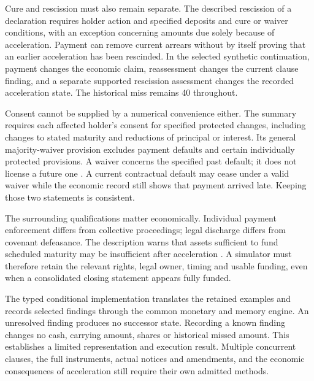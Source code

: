 Cure and rescission must also remain separate. The described rescission of a
declaration requires holder action and specified deposits and cure or waiver
conditions, with an exception concerning amounts due solely because of
acceleration. Payment can remove current arrears without by itself proving
that an earlier acceleration has been rescinded. In the selected synthetic
continuation, payment changes the economic claim, reassessment changes the
current clause finding, and a separate supported rescission assessment changes
the recorded acceleration state. The historical miss remains 40 throughout.

Consent cannot be supplied by a numerical convenience either. The summary
requires each affected holder's consent for specified protected changes,
including changes to stated maturity and reductions of principal or interest.
Its general majority-waiver provision excludes payment defaults and certain
individually protected provisions. A waiver concerns the specified past
default; it does not license a future one
\citep[Exhibit 4.1, printed pp.~11--12]{apple2024}. A current contractual default
may cease under a valid waiver while the economic record still shows that
payment arrived late. Keeping those two statements is consistent.

The surrounding qualifications matter economically. Individual payment
enforcement differs from collective proceedings; legal discharge differs
from covenant defeasance. The description warns that assets sufficient to
fund scheduled maturity may be insufficient after acceleration
\citep[Exhibit 4.1, printed pp.~10--13]{apple2024}. A simulator must therefore
retain the relevant rights, legal owner, timing and usable funding, even
when a consolidated closing statement appears fully funded.

The typed conditional implementation translates the retained examples and
records selected findings through the common monetary and memory engine.
An unresolved finding produces no successor state. Recording a known finding
changes no cash, carrying amount, shares or historical missed amount. This
establishes a limited representation and execution result. Multiple concurrent
clauses, the full instruments, actual notices and amendments, and the economic
consequences of acceleration still require their own admitted methods.
